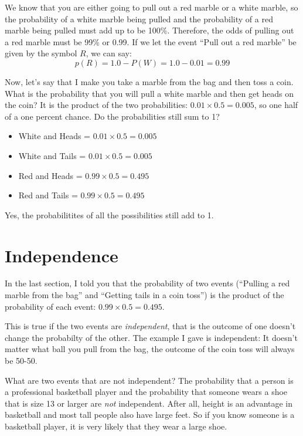 We know that you are either going to pull out a red marble or a white marble,
so the probability of a white marble being pulled and the probability
of a red marble being pulled must add up to be 100\%. Therefore, the odds of
pulling out a red marble must be 99\% or 0.99. If we let the event ``Pull out a red marble'' be given by the symbol $R$, we can say:
\begin{equation*}
  p(R) = 1.0 - P(W) = 1.0 - 0.01 = 0.99
\end{equation*}

Now, let's say that I make you take a marble from the bag and then
toss a coin. What is the probability that you will pull a white marble
and then get heads on the coin? It is the product of the two
probabilities: $0.01 \times 0.5 = 0.005$, so one half of a one percent
chance. Do the probabilities still sum to 1?
\begin{itemize}
\item White and Heads = $0.01 \times 0.5 = 0.005$
\item White and Tails = $0.01 \times 0.5 = 0.005$
\item Red and Heads = $0.99 \times 0.5 = 0.495$
\item Red and Tails = $0.99 \times 0.5 = 0.495$
\end{itemize}
Yes, the probabilitites of all the possibilities still add to 1.

\section{Independence}

In the last section, I told you that the probability of two events
(``Pulling a red marble from the bag'' and ``Getting tails in a coin
toss'') is the product of the probability of each event: $0.99 \times 0.5 = 0.495$.

This is true if the two events are \textit{independent}, that is the
outcome of one doesn't change the probabilty of the other.  The
example I gave is independent: It doesn't matter what ball you pull
from the bag, the outcome of the coin toss will always be 50-50.

What are two events that are not independent? The probability that a
person is a professional basketball player and the probability that
someone wears a shoe that is size 13 or larger are \textit{not}
independent. After all, height is an advantage in basketball and most
tall people also have large feet. So if you know someone is a
basketball player, it is very likely that they wear a large shoe.

